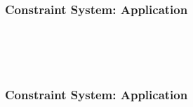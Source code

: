 \begin{frame}[b]
\frametitle{Constraint System: Application}
\begin{prooftree}
\end{prooftree}
\vfill
\begin{prooftree}
\end{prooftree}
\mbox{}\\\mbox{}\\\mbox{}\\\mbox{}
\end{frame}

\begin{frame}[b]
\frametitle{Constraint System: Application}
\begin{prooftree}
\end{prooftree}
\vfill
\begin{prooftree}
\end{prooftree}
\mbox{}\\\mbox{}\\\mbox{}\\\mbox{}
\end{frame}


